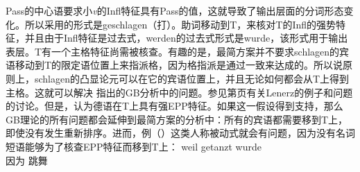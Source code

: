 Pass的中心语要求小\emph{v}的Infl特征具有Pass的值，这就导致了输出层面的分词形态变化。所以采用的形式是geschlagen（打）。助词移动到T，来核对T的Infl的强势特征，并且由于Infl特征是过去式，werden的过去式形式是wurde，该形式用于输出表层。T有一个主格特征尚需被核查。有趣的是，最简方案并不要求schlagen的宾语移动到T的限定语位置上来指派格，因为格指派是通过一致来达成的。所以说原则上，schlagen的凸显论元可以在它的宾语位置上，并且无论如何都会从T上得到主格。这就可以解决 \citet[4.4.3]{Lenerz77}指出的GB分析中的问题。参见第\pageref{ex-passive-German-no-movement}页有关Lenerz的例子和问题的讨论。但是，\citet[]{Adger2003a}认为德语在T上具有强EPP特征。如果这一假设得到支持，那么GB理论的所有问题都会延伸到最简方案的分析中：所有的宾语都需要移到T上，即使没有发生重新排序。进而，例（）这类人称被动式就会有问题，因为没有名词短语能够为了核查EPP特征而移到T上：
\ea
\gll weil getanzt wurde\\
     因为 跳舞 \passivepst{}\\
\z
{}


